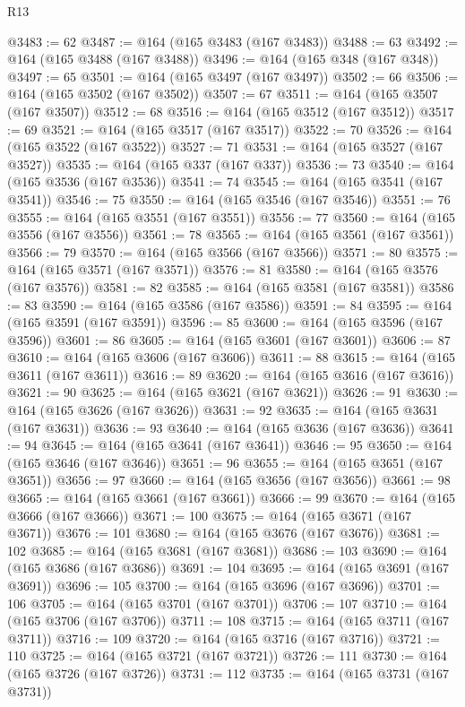 \begin{lexlean}{R13}
\begin{coremodule}
@3483 := 62
@3487 := @164 (@165 @3483 (@167 @3483))
@3488 := 63
@3492 := @164 (@165 @3488 (@167 @3488))
@3496 := @164 (@165 @348 (@167 @348))
@3497 := 65
@3501 := @164 (@165 @3497 (@167 @3497))
@3502 := 66
@3506 := @164 (@165 @3502 (@167 @3502))
@3507 := 67
@3511 := @164 (@165 @3507 (@167 @3507))
@3512 := 68
@3516 := @164 (@165 @3512 (@167 @3512))
@3517 := 69
@3521 := @164 (@165 @3517 (@167 @3517))
@3522 := 70
@3526 := @164 (@165 @3522 (@167 @3522))
@3527 := 71
@3531 := @164 (@165 @3527 (@167 @3527))
@3535 := @164 (@165 @337 (@167 @337))
@3536 := 73
@3540 := @164 (@165 @3536 (@167 @3536))
@3541 := 74
@3545 := @164 (@165 @3541 (@167 @3541))
@3546 := 75
@3550 := @164 (@165 @3546 (@167 @3546))
@3551 := 76
@3555 := @164 (@165 @3551 (@167 @3551))
@3556 := 77
@3560 := @164 (@165 @3556 (@167 @3556))
@3561 := 78
@3565 := @164 (@165 @3561 (@167 @3561))
@3566 := 79
@3570 := @164 (@165 @3566 (@167 @3566))
@3571 := 80
@3575 := @164 (@165 @3571 (@167 @3571))
@3576 := 81
@3580 := @164 (@165 @3576 (@167 @3576))
@3581 := 82
@3585 := @164 (@165 @3581 (@167 @3581))
@3586 := 83
@3590 := @164 (@165 @3586 (@167 @3586))
@3591 := 84
@3595 := @164 (@165 @3591 (@167 @3591))
@3596 := 85
@3600 := @164 (@165 @3596 (@167 @3596))
@3601 := 86
@3605 := @164 (@165 @3601 (@167 @3601))
@3606 := 87
@3610 := @164 (@165 @3606 (@167 @3606))
@3611 := 88
@3615 := @164 (@165 @3611 (@167 @3611))
@3616 := 89
@3620 := @164 (@165 @3616 (@167 @3616))
@3621 := 90
@3625 := @164 (@165 @3621 (@167 @3621))
@3626 := 91
@3630 := @164 (@165 @3626 (@167 @3626))
@3631 := 92
@3635 := @164 (@165 @3631 (@167 @3631))
@3636 := 93
@3640 := @164 (@165 @3636 (@167 @3636))
@3641 := 94
@3645 := @164 (@165 @3641 (@167 @3641))
@3646 := 95
@3650 := @164 (@165 @3646 (@167 @3646))
@3651 := 96
@3655 := @164 (@165 @3651 (@167 @3651))
@3656 := 97
@3660 := @164 (@165 @3656 (@167 @3656))
@3661 := 98
@3665 := @164 (@165 @3661 (@167 @3661))
@3666 := 99
@3670 := @164 (@165 @3666 (@167 @3666))
@3671 := 100
@3675 := @164 (@165 @3671 (@167 @3671))
@3676 := 101
@3680 := @164 (@165 @3676 (@167 @3676))
@3681 := 102
@3685 := @164 (@165 @3681 (@167 @3681))
@3686 := 103
@3690 := @164 (@165 @3686 (@167 @3686))
@3691 := 104
@3695 := @164 (@165 @3691 (@167 @3691))
@3696 := 105
@3700 := @164 (@165 @3696 (@167 @3696))
@3701 := 106
@3705 := @164 (@165 @3701 (@167 @3701))
@3706 := 107
@3710 := @164 (@165 @3706 (@167 @3706))
@3711 := 108
@3715 := @164 (@165 @3711 (@167 @3711))
@3716 := 109
@3720 := @164 (@165 @3716 (@167 @3716))
@3721 := 110
@3725 := @164 (@165 @3721 (@167 @3721))
@3726 := 111
@3730 := @164 (@165 @3726 (@167 @3726))
@3731 := 112
@3735 := @164 (@165 @3731 (@167 @3731))

\end{coremodule}
\end{lexlean}
